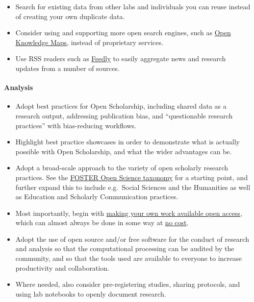 \begin{itemize}
\item
  Search for existing data from other labs and individuals you can reuse
  instead of creating your own duplicate data.
\item
  Consider using and supporting more open search engines, such as
  \href{https://openknowledgemaps.org/}{Open Knowledge Maps}, instead of
  proprietary services.
\item
  Use RSS readers such as \href{https://feedly.com/}{Feedly} to easily
  aggregate news and research updates from a number of sources.
\end{itemize}

\paragraph{Analysis}\label{analysis-1}

\begin{itemize}
\item
  Adopt best practices for Open Scholarship, including shared data as a
  research output, addressing publication bias, and ``questionable
  research practices'' with bias-reducing workflows.
\item
  Highlight best practice showcases in order to demonstrate what is
  actually possible with Open Scholarship, and what the wider advantages
  can be.
\item
  Adopt a broad-scale approach to the variety of open scholarly research
  practices. See the
  \href{https://www.fosteropenscience.eu/resources}{FOSTER Open Science
  taxonomy} for a starting point, and further expand this to include
  e.g.~Social Sciences and the Humanities as well as Education and
  Scholarly Communication practices.
\item
  Most importantly, begin with
  \href{https://cyber.harvard.edu/hoap/How_to_make_your_own_work_open_access}{making
  your own work available open access}, which can almost always be done
  in some way at
  \href{https://figshare.com/collections/How_to_make_your_work_100_Open_Access_for_free_and_legally_multi-lingual_/3943972}{no
  cost}.
\item
  Adopt the use of open source and/or free software for the conduct of
  research and analysis so that the computational processing can be
  audited by the community, and so that the tools used are available to
  everyone to increase productivity and collaboration.
\item
  Where needed, also consider pre-registering studies, sharing
  protocols, and using lab notebooks to openly document research.
\end{itemize}

